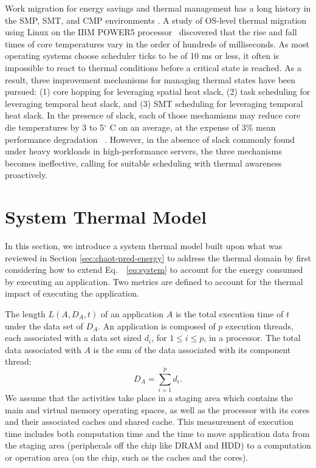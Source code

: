 \documentclass[times, 10pt,twocolumn]{IEEEtran}
\newcommand{\equationname}{Eq.\ }
\begin{document}
Work migration for energy savings and thermal management has a long
history in the SMP, SMT, and CMP environments \cite{Yao1995,Gomaa2004,Kumar2006,Yang2008}.
A study of OS-level thermal
migration using Linux on the IBM POWER5 processor~\cite{Choi2007}
discovered that the rise and fall times of core temperatures vary in the
order of hundreds of milliseconds.  
As most operating systems choose
scheduler ticks to be of 10 ms or less, it often is impossible to
react to thermal conditions before a critical state is reached.  
As a result, three improvement mechanisms for managing thermal states have been pursued:
(1) core hopping for leveraging spatial heat slack, (2) task scheduling
for leveraging temporal heat slack, and (3) SMT scheduling for
leveraging temporal heat slack.
In the presence of slack, each of those mechamisms may 
reduce core die temperatures by 3 to 5$^{\circ}$ C on an average,
at the expense of 3\% mean performance degradation ~\cite{Choi2007,Ayoub2009}.
However, in the absence of slack commonly found under heavy workloads in
high-performance servers, the three mechanisms becomes ineffective,
calling for suitable scheduling with thermal awareness proactively.

\section{System Thermal Model}
\label{sec:model}
In this section, we introduce a system thermal model built upon
what was reviewed in Section \ref{sec:chaot-pred-energy} to
address the thermal domain by first considering how to extend
\equationname~\eqref{eq:system} to account for the energy consumed by
executing an application.  
Two metrics are defined to account for the thermal impact of executing the
application.

The length $L(A,D_{A},t)$ of an application $A$ is the total execution time of
$t$ under the data set of $D_{A}$.
An application is composed of $p$ execution threads, each associated with
a data set sized $d_{i}$, for $1\leq i \leq p$,
in a processor. The total data associated with $A$ is the sum of
the data associated with its component thread:
\begin{equation}
\label{eq:totaldata} D_{A}=\displaystyle\sum_{i=1}^{p}{d_i}.
\end{equation} 
We assume that the activities take place in a staging
area which contains the main and virtual memory operating spaces, as
well as the processor with its cores and their associated caches and
shared cache.  This measurement of execution time includes both
computation time and the time to move application data from the
staging area (peripherals off the chip like DRAM and HDD) to a
computation or operation area (on the chip, such as the caches and the cores).
\end{document}

